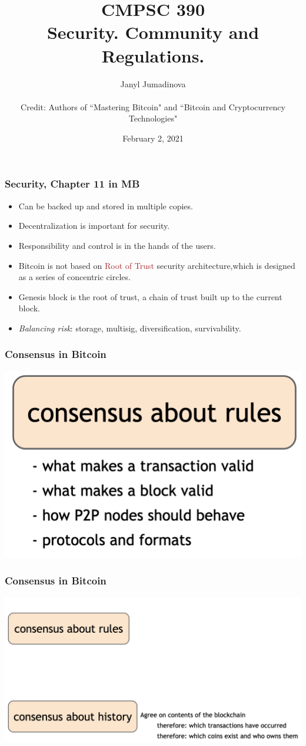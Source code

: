 \documentclass{beamer}
\title{CMPSC 390 \\ Security. Community and Regulations.}
\author{Janyl Jumadinova \\ $ $ \\ Credit: Authors of ``Mastering Bitcoin" and ``Bitcoin and Cryptocurrency Technologies"}
\date{February 2, 2021}
\begin{document}
\begin{frame}
  \titlepage
\end{frame}

\begin{frame}
  \frametitle{Security, Chapter 11 in MB}
	\begin{itemize}
		\item Can be backed up and stored in multiple copies. \pause
		\item Decentralization is important for security. \pause
		\item Responsibility and control is in the hands of the users. \pause
		\item Bitcoin is not based on \textcolor{brown}{Root of Trust} security architecture,which is designed as a series of concentric circles. \pause
		\item Genesis block is the root of trust, a chain of trust built up to the current block. \pause
		\item \emph{Balancing risk}: storage, multisig, diversification, survivability.
	\end{itemize}
\end{frame}
\begin{frame}
  \frametitle{Consensus in Bitcoin}
 	\centering
	\includegraphics[scale=0.28]{rules}
\end{frame}
\begin{frame}
  \frametitle{Consensus in Bitcoin}
 	\centering
	\includegraphics[scale=0.28]{history}
\end{frame}
\end{document}
